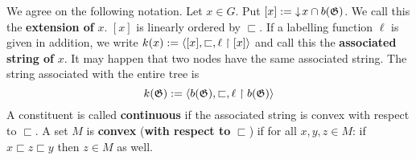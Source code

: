 We agree on the following notation. Let $x \in G$. Put $[x] := 
{\downarrow\! x} \cap b(\mathfrak{G})$. We call this the \textbf{extension of} $x$.
\index{$[x]$}%
$[x]$ is linearly ordered by $\sqsubset$. If a labelling function 
$\ell$ is given in addition, we write $k(x) := \langle [x], \sqsubset, 
\ell \restriction [x]\rangle$ 
and call this the \textbf{associated string of} $x$.
It may happen that two nodes have the same associated string.
The string associated with the entire tree is
\begin{equation}
k(\mathfrak{G}) := \langle b(\mathfrak{G}), \sqsubset, \ell \restriction b(\mathfrak{G})\rangle
\end{equation}
A constituent is called \textbf{continuous} if the associated
string is convex with respect to $\sqsubset$. A set $M$ is 
\textbf{convex} (\textbf{with respect to} $\sqsubset$) if for all 
$x, y, z \in M$: if $x \sqsubset z \sqsubset y$ then $z \in M$ 
as well.


